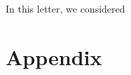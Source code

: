\documentclass[journal]{IEEEtran}
\begin{document}
In this letter, we considered 



\section{Appendix} \label{sec:Appendix}
\end{document}
